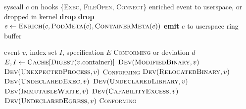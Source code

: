 \documentclass[conference]{IEEEtran}
\begin{document}
\begin{algorithm}[!t]
\footnotesize
\caption{eBPF Event Collection (per syscall, in kernel)}
\label{alg:collect}
\begin{algorithmic}[1]
\Require syscall $c$ on hooks
  \{\textsc{Exec}, \textsc{FileOpen}, \textsc{Connect}\}
\Ensure enriched event to userspace, or dropped in kernel
  \State \textbf{drop} 
\EndIf
{}
  \State \textbf{drop} 
\EndIf
\State $e \gets \textsc{Enrich}(c, \textsc{PodMeta}(c), \textsc{ContainerMeta}(c))$
\State \textbf{emit} $e$ to userspace ring buffer
\end{algorithmic}
\end{algorithm}

\begin{algorithm}[!t]
\footnotesize
\caption{Binding Verification (per event)}
\label{alg:verify}
\begin{algorithmic}[1]
\Require event $v$, index set $I$, specification $E$
\Ensure \textsc{Conforming} or deviation $d$
\State $E,I \gets \textsc{Cache}[\textsc{Digest}(v.\text{container})]$
      \State \Return $\textsc{Dev}(\textsc{ModifiedBinary}, v)$
    \EndIf
      \State \Return $\textsc{Dev}(\textsc{UnexpectedProcess}, v)$
    \EndIf
    \State \Return \textsc{Conforming}
  \EndIf
    \State \Return $\textsc{Dev}(\textsc{RelocatedBinary}, v)$
  \EndIf
  \State \Return $\textsc{Dev}(\textsc{UndeclaredExec}, v)$
  \State \Return $\textsc{Dev}(\textsc{UndeclaredLibrary}, v)$
  \State \Return $\textsc{Dev}(\textsc{ImmutableWrite}, v)$
  \State \Return $\textsc{Dev}(\textsc{CapabilityExcess}, v)$
  \State \Return $\textsc{Dev}(\textsc{UndeclaredEgress}, v)$
\EndIf
\State \Return \textsc{Conforming}
\end{algorithmic}
\end{algorithm}
\end{document}
